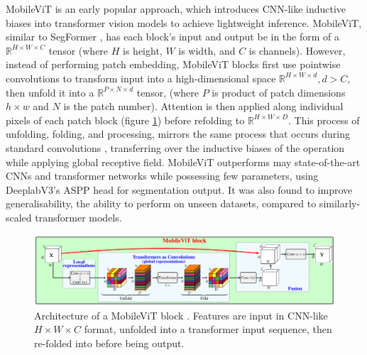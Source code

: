 \documentclass[a4paper,12pt]{report}
\begin{document}
MobileViT \cite{mehta_mobilevit_2022} is an early popular approach, which introduces CNN-like inductive biases into transformer vision models to achieve lightweight inference. MobileViT, similar to SegFormer \cite{xie_segformer_2021}, has each block's input and output be in the form of a $\mathbb{R}^{H \times W \times C}$ tensor (where $H$ is height, $W$ is width, and $C$ is channels). However, instead of performing patch embedding, MobileViT blocks first use pointwise convolutions to transform input into a high-dimensional space $\mathbb{R}^{H \times W \times d}, d > C$, then unfold it into a $\mathbb{R}^{P \times N \times d}$ tensor, (where $P$ is product of patch dimensions $h \times w$ and $N$ is the patch number). Attention is then applied along individual pixels of each patch block (figure \ref{fig:mobilevit_block}) before refolding to $\mathbb{R}^{H \times W \times D}$. This process of unfolding, folding, and processing, mirrors the same process that occurs during standard convolutions \cite{contributors_unfold_nodate}, transferring over the inductive biases of the operation while applying global receptive field. MobileViT outperforms may state-of-the-art CNNs and transformer networks while possessing few parameters, using DeeplabV3's ASPP head \cite{chen_rethinking_2017} for segmentation output. It was also found to improve generalisability, the ability to perform on unseen datasets, compared to similarly-scaled transformer models.

\begin{figure}[t!]
    \centering
    \includegraphics[width=\textwidth]{res/mobilevit-block.png}
    \caption{Architecture of a MobileViT block \cite{mehta_mobilevit_2022}. Features are input in CNN-like $H \times W \times C$ format, unfolded into a transformer input sequence, then re-folded into before being output.}
    \label{fig:mobilevit_block}
\end{figure}
\end{document}

